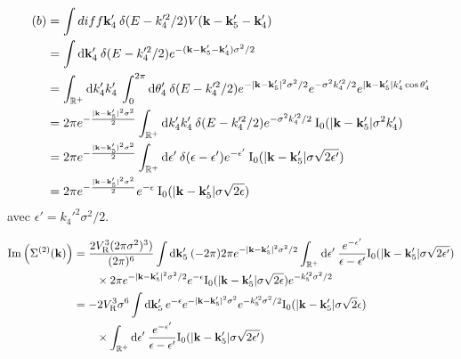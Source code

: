 \begin{align}
(b)&=\int{diff\mathbf{k}_{\mathrm{4}}' \: \delta(E-k_{\mathrm{4}}'^2/2) V(\mathbf{k}-\mathbf{k}_{\mathrm{5}}' -\mathbf{k}_{\mathrm{4}}')} \\
&= \int{\mathop{}\mathopen{}\mathrm{d}\mathbf{k}_{\mathrm{4}}' \: \delta(E-k_{\mathrm{4}}'^2/2) e^{-(\mathbf{k}-\mathbf{k}_{\mathrm{5}}'-\mathbf{k}_{\mathrm{4}}')\sigma^2/2}}\\
&=\int_{\mathbb{R}^+}{\mathop{}\mathopen{}\mathrm{d} k_{\mathrm{4}}' k_{\mathrm{4}}' \: \int_0^{2\pi}{\mathop{}\mathopen{}\mathrm{d}\theta_{\mathrm{4}}' \: \delta(E-k_{\mathrm{4}}'^2/2) e^{-|\mathbf{k}-\mathbf{k}_{\mathrm{5}}'|^2\sigma^2/2} e^{-\sigma^2 k_{\mathrm{4}}'^2/2} e^{|\mathbf{k}-\mathbf{k}_{\mathrm{5}}'| k_{\mathrm{4}}' \cos{\theta_{\mathrm{4}}'} } }} \\
&=2\pi e^{-\frac{|\mathbf{k}-\mathbf{k}_{\mathrm{5}}'|^2\sigma^2}{2}} \int_{\mathbb{R}^+}{\mathop{}\mathopen{}\mathrm{d} k_{\mathrm{4}}' k_{\mathrm{4}}' \:\delta(E- k_{\mathrm{4}}'^2/2) e^{-\sigma^2 k_{\mathrm{4}}'^2/2} \: \mathrm{I_0}(|\mathbf{k}-\mathbf{k}_{\mathrm{5}}'| \sigma^2 k_{\mathrm{4}}')}\\
&=2\pi e^{-\frac{|\mathbf{k}-\mathbf{k}_{\mathrm{5}}'|^2\sigma^2}{2}} \int_{\mathbb{R}^+}{\mathop{}\mathopen{}\mathrm{d}\epsilon' \:\delta(\epsilon-\epsilon') e^{-\epsilon'} \: \mathrm{I_0}(|\mathbf{k}-\mathbf{k}_{\mathrm{5}}'| \sigma \sqrt{2\epsilon'})}\\
&=2\pi e^{-\frac{|\mathbf{k}-\mathbf{k}_{\mathrm{5}}'|^2\sigma^2}{2}} e^{-\epsilon} \: \mathrm{I_0}(|\mathbf{k}-\mathbf{k}_{\mathrm{5}}'| \sigma \sqrt{2\epsilon})
\end{align}
avec $\epsilon'=k_{\mathrm{4}}'^2\sigma^2/2$.


\begin{align}
\mathrm{Im}\left( \Sigma^{(2)}(\mathbf{k})\right)&= \frac{2 V_{\mathrm{R}}^3 (2\pi\sigma^2)^3)}{(2\pi)^6} \int{\mathop{}\mathopen{}\mathrm{d}\mathbf{k}_{\mathrm{5}}' \: (-2\pi) 2\pi e^{-|\mathbf{k}-\mathbf{k}_{\mathrm{5}}'|^2\sigma^2/2} \int_{\mathbb{R}^+}{\mathop{}\mathopen{}\mathrm{d}\epsilon' \: \frac{e^{-\epsilon'}}{\epsilon-\epsilon'} \mathrm{I_0}(|\mathbf{k}-\mathbf{k}_{\mathrm{5}}'|\sigma\sqrt{2\epsilon'})}}\\
&\nonumber \qquad \times 2\pi e^{-|\mathbf{k}-\mathbf{k}_{\mathrm{5}}'|^2\sigma^2/2} e^{-\epsilon} \mathrm{I_0}(|\mathbf{k}-\mathbf{k}_{\mathrm{5}}'|\sigma \sqrt{2\epsilon}) e^{-k_{\mathrm{5}}'^2\sigma^2/2} \\
 &= -2V_{\mathrm{R}}^3\sigma^6 \int{\mathop{}\mathopen{}\mathrm{d}\mathbf{k}_{\mathrm{5}}' \: e^{-\epsilon} e^{-|\mathbf{k}-\mathbf{k}_{\mathrm{5}}'|^2 \sigma^2} e^{-k_{\mathrm{5}}'^2 \sigma^2/2} \mathrm{I_0}(|\mathbf{k}-\mathbf{k}_{\mathrm{5}}'|\sigma \sqrt{2}\epsilon)} \\
 &\nonumber \qquad \times \int_{\mathbb{R}^+}{\mathop{}\mathopen{}\mathrm{d} \epsilon' \: \frac{e^{-\epsilon'}}{\epsilon-\epsilon'} \mathrm{I_0}(|\mathbf{k}-\mathbf{k}_{\mathrm{5}}'|\sigma \sqrt{2\epsilon'})}
\end{align}



